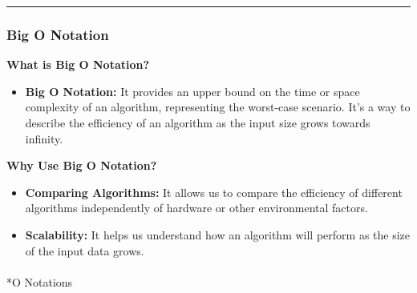\documentclass[
  letterpaper,
  DIV=11,
  numbers=noendperiod]{scrreprt}
\makeatletter
\let\oldparagraph\paragraph
\renewcommand{\paragraph}{
    \@ifstar
      \xxxParagraphStar
      \xxxParagraphNoStar
  }
\newcommand{\xxxParagraphStar}[1]{\oldparagraph*{#1}\mbox{}}
\newcommand{\xxxParagraphNoStar}[1]{\oldparagraph{#1}\mbox{}}
\providecommand{\tightlist}{%
  \setlength{\itemsep}{0pt}\setlength{\parskip}{0pt}}
\makeatother
\begin{document}
\begin{center}\rule{0.5\linewidth}{0.5pt}\end{center}

\subsubsection*{Big O Notation}\label{big-o-notation}

\textbf{What is Big O Notation?}

\begin{itemize}
\tightlist
\item
  \textbf{Big O Notation:} It provides an upper bound on the time or
  space complexity of an algorithm, representing the worst-case
  scenario. It's a way to describe the efficiency of an algorithm as the
  input size grows towards infinity.
\end{itemize}

\textbf{Why Use Big O Notation?}

\begin{itemize}
\tightlist
\item
  \textbf{Comparing Algorithms:} It allows us to compare the efficiency
  of different algorithms independently of hardware or other
  environmental factors.
\item
  \textbf{Scalability:} It helps us understand how an algorithm will
  perform as the size of the input data grows.
\end{itemize}

\paragraph*{O Notations}\label{o-notations}
\end{document}
